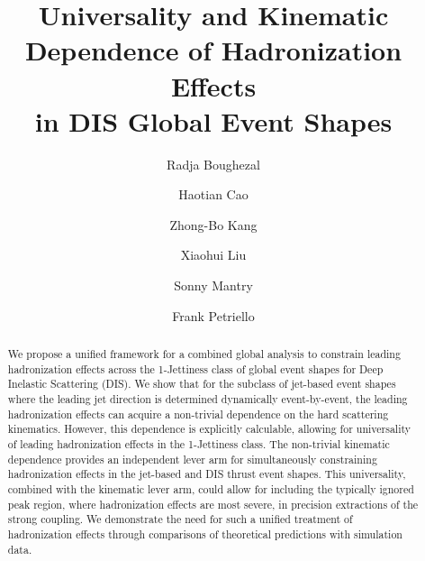 \documentclass[prd,aps,nofootinbib,twocolumn,showpacs,amsmath,superscriptaddress]{revtex4-2}
\begin{document}
\title{\bf Universality and Kinematic Dependence of Hadronization Effects  \\ in DIS Global Event Shapes}



\author{Radja Boughezal}

\author{Haotian Cao}

\author{Zhong-Bo Kang}
                   
\author{Xiaohui Liu}

\author{Sonny Mantry}
\author{Frank Petriello}



\begin{abstract}
 \noindent
 
We propose a unified framework for a combined global analysis to constrain leading hadronization effects across the 1-Jettiness class of global event shapes for Deep Inelastic Scattering (DIS). We show that for the subclass of jet-based event shapes where the leading jet direction is determined dynamically event-by-event, the leading hadronization effects can acquire a non-trivial dependence on the  hard scattering kinematics. However, this dependence is explicitly calculable, allowing for universality of leading hadronization effects in the 1-Jettiness class. The non-trivial kinematic dependence provides an independent lever arm for simultaneously constraining hadronization effects in the jet-based and  DIS thrust event shapes. This universality, combined with the kinematic lever arm, could allow for including the typically ignored peak region,
where hadronization effects are most severe, in precision extractions of the strong coupling. We demonstrate the need for such a unified treatment of hadronization effects through comparisons of theoretical predictions with simulation data.
\end{abstract}
\end{document}
